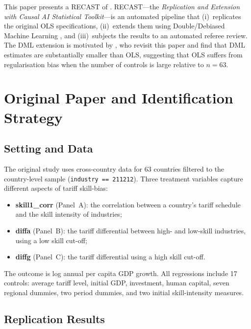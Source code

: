 \documentclass[12pt]{article}
\begin{document}
This paper presents a RECAST of \citet{nunntrefler2010}. RECAST---the
\textit{Replication and Extension with Causal AI Statistical Toolkit}---is
an automated pipeline that (i)~replicates the original OLS specifications,
(ii)~extends them using Double/Debiased Machine Learning
\citep{chernozhukov2018}, and (iii)~subjects the results to an automated
referee review. The DML extension is motivated by \citet{baiardi2024},
who revisit this paper and find that DML estimates are substantially
smaller than OLS, suggesting that OLS suffers from regularisation bias
when the number of controls is large relative to $n = 63$.

\section{Original Paper and Identification Strategy}

\subsection{Setting and Data}

The original study uses cross-country data for 63 countries filtered
to the country-level sample (\texttt{industry == 211212}). Three treatment
variables capture different aspects of tariff skill-bias:
\begin{itemize}
  \item \textbf{skill1\_corr} (Panel~A): the correlation between
        a country's tariff schedule and the skill intensity of industries;
  \item \textbf{diffa} (Panel~B): the tariff differential between
        high- and low-skill industries, using a low skill cut-off;
  \item \textbf{diffg} (Panel~C): the tariff differential using a
        high skill cut-off.
\end{itemize}
The outcome is log annual per capita GDP growth. All regressions include
17 controls: average tariff level, initial GDP, investment, human capital,
seven regional dummies, two period dummies, and two initial skill-intensity
measures.

\subsection{Replication Results}
\end{document}
